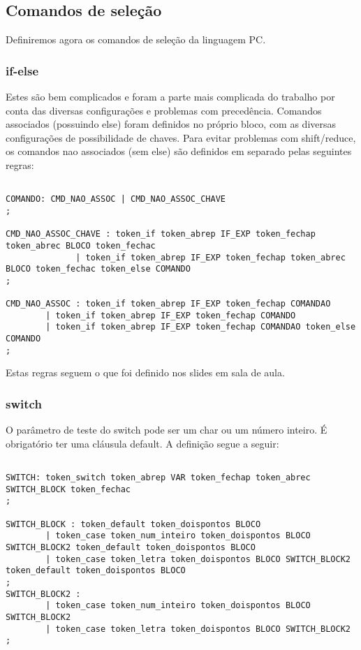 \documentclass[a4paper,10pt]{article}
\begin{document}
\subsection{Comandos de seleção}

Definiremos agora os comandos de seleção da linguagem PC.

\subsubsection{if-else}

Estes são bem complicados e foram a parte mais complicada do trabalho por conta das diversas configurações e problemas com precedência.
Comandos associados (possuindo else) foram definidos no próprio bloco, com as diversas configurações de possibilidade de chaves. Para
evitar problemas com shift/reduce, os comandos nao associados (sem else) são definidos em separado pelas seguintes regras:



\begin{verbatim}

COMANDO: CMD_NAO_ASSOC | CMD_NAO_ASSOC_CHAVE
;

CMD_NAO_ASSOC_CHAVE : token_if token_abrep IF_EXP token_fechap token_abrec BLOCO token_fechac
		      | token_if token_abrep IF_EXP token_fechap token_abrec BLOCO token_fechac token_else COMANDO
;

CMD_NAO_ASSOC : token_if token_abrep IF_EXP token_fechap COMANDAO
		| token_if token_abrep IF_EXP token_fechap COMANDO
		| token_if token_abrep IF_EXP token_fechap COMANDAO token_else COMANDO
;

\end{verbatim}

Estas regras seguem o que foi definido nos slides em sala de aula.
\subsubsection{switch}

O parâmetro de teste do switch pode ser um char ou um número inteiro. É obrigatório ter uma cláusula default. A definição segue a seguir:

\begin{verbatim}

SWITCH: token_switch token_abrep VAR token_fechap token_abrec SWITCH_BLOCK token_fechac
;

SWITCH_BLOCK : token_default token_doispontos BLOCO 
		| token_case token_num_inteiro token_doispontos BLOCO SWITCH_BLOCK2 token_default token_doispontos BLOCO
		| token_case token_letra token_doispontos BLOCO SWITCH_BLOCK2 token_default token_doispontos BLOCO
;
SWITCH_BLOCK2 : 
		| token_case token_num_inteiro token_doispontos BLOCO SWITCH_BLOCK2
		| token_case token_letra token_doispontos BLOCO SWITCH_BLOCK2 
;
\end{verbatim}
\end{document}

